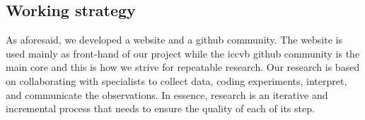 \subsection{Working strategy}
As aforesaid, we developed a website and a github community.
The website is used mainly as front-hand of our project while the \ac{iccvb} github community is the main core and this is how we strive for repeatable research.
Our research is based on collaborating with specialists to collect data, coding experiments, interpret, and communicate the observations.
In essence, research is an iterative and incremental process that needs to ensure the quality of each of its step. 



